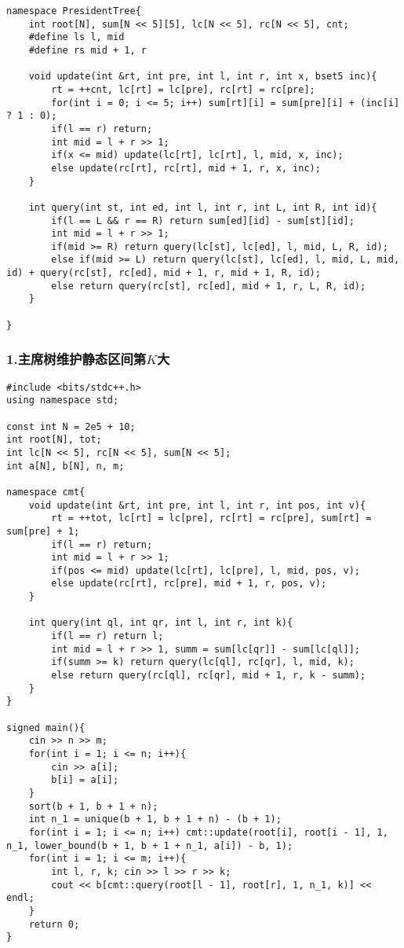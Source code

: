 \documentclass[]{article}
\begin{document}
\begin{verbatim}
namespace PresidentTree{
    int root[N], sum[N << 5][5], lc[N << 5], rc[N << 5], cnt;
    #define ls l, mid
    #define rs mid + 1, r

    void update(int &rt, int pre, int l, int r, int x, bset5 inc){
        rt = ++cnt, lc[rt] = lc[pre], rc[rt] = rc[pre];
        for(int i = 0; i <= 5; i++) sum[rt][i] = sum[pre][i] + (inc[i] ? 1 : 0);
        if(l == r) return;
        int mid = l + r >> 1;
        if(x <= mid) update(lc[rt], lc[rt], l, mid, x, inc);
        else update(rc[rt], rc[rt], mid + 1, r, x, inc);
    }

    int query(int st, int ed, int l, int r, int L, int R, int id){
        if(l == L && r == R) return sum[ed][id] - sum[st][id];
        int mid = l + r >> 1;
        if(mid >= R) return query(lc[st], lc[ed], l, mid, L, R, id);
        else if(mid >= L) return query(lc[st], lc[ed], l, mid, L, mid, id) + query(rc[st], rc[ed], mid + 1, r, mid + 1, R, id);
        else return query(rc[st], rc[ed], mid + 1, r, L, R, id);
    }

}
\end{verbatim}

\hypertarget{ux4e3bux5e2dux6811ux7ef4ux62a4ux9759ux6001ux533aux95f4ux7b2ckux5927}{%
\subsubsection{\texorpdfstring{1.主席树维护静态区间第\(K\)大}{1.主席树维护静态区间第K大}}\label{ux4e3bux5e2dux6811ux7ef4ux62a4ux9759ux6001ux533aux95f4ux7b2ckux5927}}

\begin{verbatim}
#include <bits/stdc++.h>
using namespace std;

const int N = 2e5 + 10;
int root[N], tot;
int lc[N << 5], rc[N << 5], sum[N << 5];
int a[N], b[N], n, m;

namespace cmt{
    void update(int &rt, int pre, int l, int r, int pos, int v){
        rt = ++tot, lc[rt] = lc[pre], rc[rt] = rc[pre], sum[rt] = sum[pre] + 1;
        if(l == r) return;
        int mid = l + r >> 1;
        if(pos <= mid) update(lc[rt], lc[pre], l, mid, pos, v);
        else update(rc[rt], rc[pre], mid + 1, r, pos, v);
    }

    int query(int ql, int qr, int l, int r, int k){
        if(l == r) return l;
        int mid = l + r >> 1, summ = sum[lc[qr]] - sum[lc[ql]];
        if(summ >= k) return query(lc[ql], rc[qr], l, mid, k);
        else return query(rc[ql], rc[qr], mid + 1, r, k - summ);
    }
}

signed main(){
    cin >> n >> m;
    for(int i = 1; i <= n; i++){
        cin >> a[i]; 
        b[i] = a[i];
    }
    sort(b + 1, b + 1 + n);
    int n_1 = unique(b + 1, b + 1 + n) - (b + 1);
    for(int i = 1; i <= n; i++) cmt::update(root[i], root[i - 1], 1, n_1, lower_bound(b + 1, b + 1 + n_1, a[i]) - b, 1);
    for(int i = 1; i <= m; i++){
        int l, r, k; cin >> l >> r >> k;
        cout << b[cmt::query(root[l - 1], root[r], 1, n_1, k)] << endl;
    }
    return 0;
}
\end{verbatim}
\end{document}

